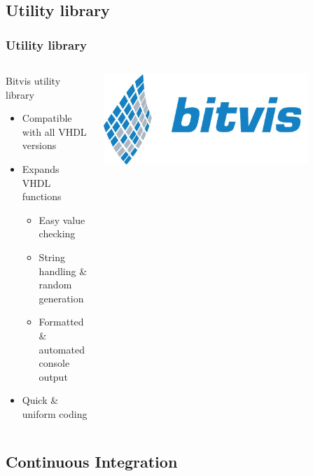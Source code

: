 \documentclass[british,10pt]{beamer}
\begin{document}
\subsection{Utility library}

\begin{frame}\frametitle{Utility library}
\begin{columns}
\begin{column}{0.6\textwidth}
Bitvis utility library
\begin{itemize}
\item Compatible with all VHDL versions
\item Expands VHDL functions
\begin{itemize}
\item Easy value checking
\item String handling \& random generation
\item Formatted \& automated console output
\end{itemize}
\item Quick \& uniform coding
\end{itemize}
\end{column}
\includegraphics[width=0.8\textwidth]{images/bitvis.png}
\end{columns}
\end{frame}

\subsection{Continuous Integration}
\end{document}
